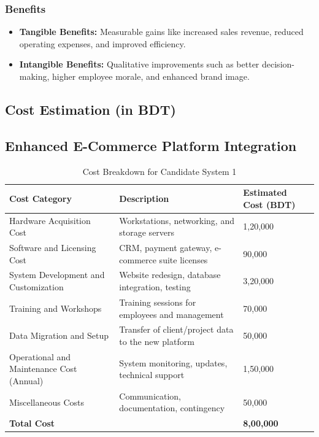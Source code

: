 \documentclass[12pt,a4paper]{article}
\begin{document}
\subsubsection{Benefits}
\begin{itemize}
    \item \textbf{Tangible Benefits:} Measurable gains like increased sales revenue, reduced operating expenses, and improved efficiency.
    \item \textbf{Intangible Benefits:} Qualitative improvements such as better decision-making, higher employee morale, and enhanced brand image.
\end{itemize}

\subsection{Cost Estimation (in BDT)}

\subsection*{Enhanced E-Commerce Platform Integration}

\begin{table}[H]
\centering
\renewcommand{\arraystretch}{1}
\begin{tabular}{|p{5cm}|p{5cm}|p{5cm}|}
\hline
\rowcolor{tableheader}
\textcolor{headertext}{\textbf{Cost Category}} & 
\textcolor{headertext}{\textbf{Description}} & 
\textcolor{headertext}{\textbf{Estimated Cost (BDT)}} \\ \hline
Hardware Acquisition Cost & Workstations, networking, and storage servers & 1,20,000 \\ \hline
Software and Licensing Cost & CRM, payment gateway, e-commerce suite licenses & 90,000 \\ \hline
System Development and Customization & Website redesign, database integration, testing & 3,20,000 \\ \hline
Training and Workshops & Training sessions for employees and management & 70,000 \\ \hline
Data Migration and Setup & Transfer of client/project data to the new platform & 50,000 \\ \hline
Operational and Maintenance Cost (Annual) & System monitoring, updates, technical support & 1,50,000 \\ \hline
Miscellaneous Costs & Communication, documentation, contingency & 50,000 \\ \hline
\textbf{Total Cost} &  & \textbf{8,00,000} \\ \hline
\end{tabular}
\caption{Cost Breakdown for Candidate System 1}
\end{table}
\end{document}
